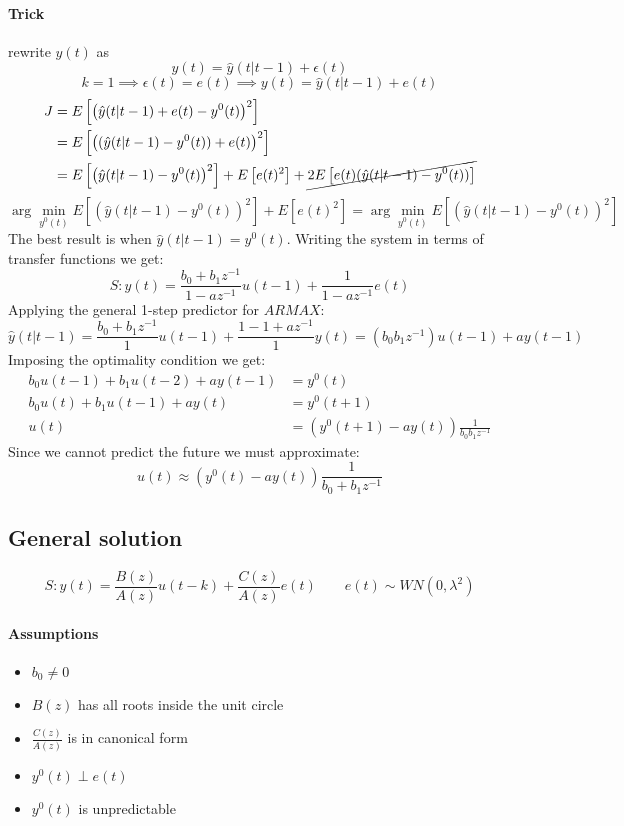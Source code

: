 \documentclass{report}
\begin{document}
\paragraph{Trick} rewrite $y(t)$ as
\[
y(t)=\hat{y}(t|t-1)+\epsilon(t)
\]
\[
k=1 
\implies \epsilon(t)=e(t) 
\implies y(t)=\hat{y}(t|t-1)+e(t)
\]
\begin{align*}
J&=E\left[\left(\hat{y}(t|t-1)+e(t)-y^0(t)\right)^2\right]\\
&=E\left[\left((\hat{y}(t|t-1)-y^0(t))+e(t)\right)^2\right]\\
&=E\left[\left(\hat{y}(t|t-1)-y^0(t)\right)^2\right]
+E\left[e(t)^2\right]
+\cancel{
2E\left[e(t)(\hat{y}(t|t-1)-y^0(t))\right]
}\\
\end{align*}
\[
\arg \min_{y^0(t)} E\left[\left(\hat{y}(t|t-1)-y^0(t)\right)^2\right]
+E\left[e(t)^2\right]
=
\arg \min_{y^0(t)} E\left[\left(\hat{y}(t|t-1)-y^0(t)\right)^2\right]
\]
The best result is when $\hat{y}(t|t-1)=y^0(t)$. Writing the system in terms of transfer functions we get:
\[
S:y(t)=
\frac{b_0+b_1z^{-1}}{1-az^{-1}}
u(t-1)
+
\frac{1}{1-az^{-1}}e(t)
\]
Applying the general 1-step predictor for $ARMAX$:
\[
\hat{y}(t|t-1)=\frac{b_0+b_1z^{-1}}{1}u(t-1)
+
\frac{1-1+az^{-1}}{1}y(t)
=
(b_0b_1z^{-1})u(t-1)+ay(t-1)
\]
Imposing the optimality condition we get:
\begin{align*}
b_0u(t-1)+b_1u(t-2)+ay(t-1)&=y^0(t)\\
b_0u(t)+b_1u(t-1)+ay(t)&=y^0(t+1)\\
u(t)&=\left(y^0(t+1)-ay(t)\right)\frac{1}{b_0b_1z^{-1}}
\end{align*}
Since we cannot predict the future we must approximate:
\[
u(t)
\approx
\left(y^0(t)-ay(t)\right)
\frac{1}{b_0+b_1z^{-1}}
\]
\subsection{General solution}
\[
S:y(t)=
\frac{B(z)}{A(z)}u(t-k)+
\frac{C(z)}{A(z)}e(t)
\qquad
e(t)\sim WN(0,\lambda^2)
\]
\paragraph{Assumptions}
\begin{itemize}
\item $b_0\neq 0$
\item $B(z)$ has all roots inside the unit circle
\item $\frac{C(z)}{A(z)}$ is in canonical form
\item $y^0(t)\perp e(t)$
\item $y^0(t)$ is unpredictable
\end{itemize}
\end{document}
